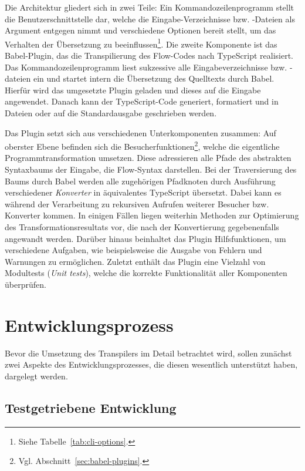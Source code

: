Die Architektur gliedert sich in zwei Teile: Ein Kommandozeilenprogramm stellt die Benutzerschnittstelle dar, welche die Eingabe-Verzeichnisse bzw. -Dateien als Argument entgegen nimmt und verschiedene Optionen bereit stellt, um das Verhalten der Übersetzung zu beeinflussen\footnote{Siehe Tabelle~\ref{tab:cli-options}.}. Die zweite Komponente ist das Babel-Plugin, das die Transpilierung des Flow-Codes nach TypeScript realisiert. Das Kommandozeilenprogramm liest sukzessive alle Eingabeverzeichnisse bzw. -dateien ein und startet intern die Übersetzung des Quelltexts durch Babel. Hierfür wird das umgesetzte Plugin geladen und dieses auf die Eingabe angewendet. Danach kann der TypeScript-Code generiert, formatiert und in Dateien oder auf die Standardausgabe geschrieben werden.

Das Plugin setzt sich aus verschiedenen Unterkomponenten zusammen: Auf oberster Ebene befinden sich die Besucherfunktionen\footnote{Vgl. Abschnitt~\ref{sec:babel-plugins}.}, welche die eigentliche Programmtransformation umsetzen. Diese adressieren alle Pfade des abstrakten Syntaxbaums der Eingabe, die Flow-Syntax darstellen. Bei der Traversierung des Baums durch Babel werden alle zugehörigen Pfadknoten durch Ausführung verschiedener \emph{Konverter} in äquivalentes TypeScript übersetzt. Dabei kann es während der Verarbeitung zu rekursiven Aufrufen weiterer Besucher bzw. Konverter kommen. In einigen Fällen liegen weiterhin Methoden zur Optimierung des Transformationsresultats vor, die nach der Konvertierung gegebenenfalls angewandt werden. Darüber hinaus beinhaltet das Plugin Hilfsfunktionen, um verschiedene Aufgaben, wie beispielsweise die Ausgabe von Fehlern und Warnungen zu ermöglichen. Zuletzt enthält das Plugin eine Vielzahl von Modultests (\textit{Unit tests}), welche die korrekte Funktionalität aller Komponenten überprüfen.

\section{Entwicklungsprozess}

Bevor die Umsetzung des Transpilers im Detail betrachtet wird, sollen zunächst zwei Aspekte des Entwicklungsprozesses, die diesen wesentlich unterstützt haben, dargelegt werden.

\subsection{Testgetriebene Entwicklung}
\label{sec:tdd}

